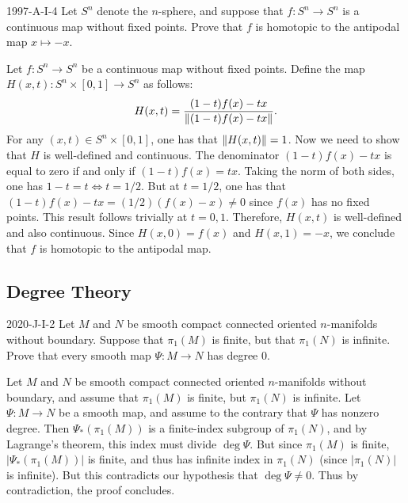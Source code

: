 \documentclass{article}
\begin{document}
	\begin{prb}{1997-A-I-4}
		Let $S^{n}$ denote the $n$-sphere, and suppose that $f: S^{n} \to S^{n}$ is a continuous map without fixed points. Prove that $f$ is homotopic to the antipodal map $x \mapsto -x$. 
	\end{prb}
	Let $f: S^{n} \to S^{n}$ be a continuous map without fixed points. Define the map $H(x, t): S^{n} \times [0,1] \to S^{n}$ as follows: 
	\begin{equation*}
		H(x,t)= \frac{(1 - t)f(x) - tx}{\left\Vert (1 - t)f(x) - tx \right\Vert}. 
	\end{equation*}
	For any $(x, t) \in S^{n} \times [0,1]$, one has that $\left\Vert H(x, t) \right\Vert = 1$. Now we need to show that $H$ is well-defined and continuous. The denominator $(1 - t)f(x) - tx$ is equal to zero if and only if $(1  - t)f(x) = tx$. Taking the norm of both sides, one has $1 - t = t \iff t = 1/2$. But at $t = 1/2$, one has that $(1 - t)f(x) - tx = (1/2)(f(x) - x) \neq 0$ since $f(x)$ has no fixed points. This result follows trivially at $t = 0, 1$. Therefore, $H(x, t)$ is well-defined and also continuous. Since $H(x, 0) = f(x)$ and $H(x, 1) = -x$, we conclude that $f$ is homotopic to the antipodal map. 
		
	\subsection{Degree Theory}
	
	\begin{prb}{2020-J-I-2}
		Let $M$ and $N$ be smooth compact connected oriented $n$-manifolds without boundary. Suppose that $\pi_1(M)$ is finite, but that $\pi_1(N)$ is infinite. Prove that every smooth map $\Psi: M \to N$ has degree 0. 
	\end{prb}
	Let $M$ and $N$ be smooth compact connected oriented $n$-manifolds without boundary, and assume that $\pi_1(M)$ is finite, but $\pi_{1}(N)$ is infinite. Let $\Psi: M \to N$ be a smooth map, and assume to the contrary that $\Psi$ has nonzero degree. Then $\Psi_{\ast}(\pi_1(M))$ is a finite-index subgroup of $\pi_1(N)$, and by Lagrange's theorem, this index must divide $\deg{\Psi}$. But since $\pi_{1}(M)$ is finite, $|\Psi_{\ast}(\pi_1(M))|$ is finite, and thus has infinite index in $\pi_1(N)$ (since $|\pi_1(N)|$ is infinite). But this contradicts our hypothesis that $\deg{\Psi} \neq 0$. Thus by contradiction, the proof concludes. 
	
\end{document}
